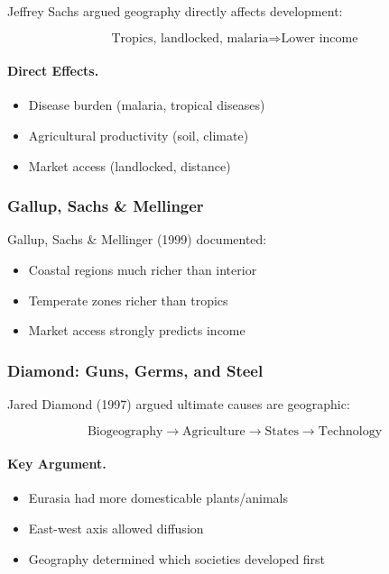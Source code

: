 Jeffrey Sachs argued geography directly affects development:

\begin{equation}
\boxed{
\text{Tropics, landlocked, malaria} \Rightarrow \text{Lower income}
}
\label{eq:sachs-geography}
\end{equation}

\paragraph{Direct Effects.}
\begin{itemize}
    \item Disease burden (malaria, tropical diseases)
    \item Agricultural productivity (soil, climate)
    \item Market access (landlocked, distance)
\end{itemize}

\subsubsection{Gallup, Sachs \& Mellinger}

Gallup, Sachs \& Mellinger (1999) documented:
\begin{itemize}
    \item Coastal regions much richer than interior
    \item Temperate zones richer than tropics
    \item Market access strongly predicts income
\end{itemize}

\subsubsection{Diamond: Guns, Germs, and Steel}

Jared Diamond (1997) argued ultimate causes are geographic:

\begin{equation}
\text{Biogeography} \to \text{Agriculture} \to \text{States} \to \text{Technology}
\end{equation}

\paragraph{Key Argument.}
\begin{itemize}
    \item Eurasia had more domesticable plants/animals
    \item East-west axis allowed diffusion
    \item Geography determined which societies developed first
\end{itemize}

